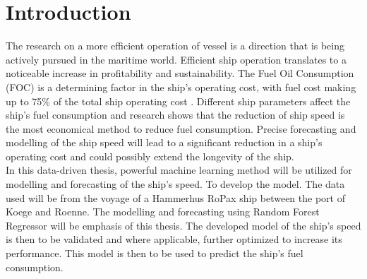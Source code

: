 \section{Introduction} \label{introduction}

The research on a more efficient operation of vessel is a direction that is being actively pursued in the maritime world. 
Efficient ship operation translates to a noticeable increase in profitability and sustainability. 
The Fuel Oil Consumption (FOC) is a determining factor in the ship's operating cost, with fuel cost making up to 75\% of the total ship operating cost \cite{Abebe.2020,Gkerekos.2019}. 
Different ship parameters affect the ship's fuel consumption and research shows that the reduction of ship speed is the most economical method to reduce fuel consumption. 
Precise forecasting and modelling of the ship speed will lead to a significant reduction in a ship's operating cost and could possibly extend the longevity of the ship. \\

In this data-driven thesis, powerful machine learning method will be utilized for modelling and forecasting of the ship's speed. To develop the model. 
The data used will be from the voyage of a Hammerhus RoPax ship between the port of Koege and Roenne. 
The modelling and forecasting using Random Forest Regressor will be emphasis of this thesis. The developed model of the ship's speed is then to be validated and where applicable, 
further optimized to increase its performance. 
This model is then to be used to predict the ship's fuel consumption. 





